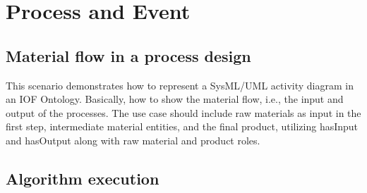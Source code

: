 \chapter{Process and Event}


\section*{Material flow in a process design}
This scenario demonstrates how to represent a SysML/UML activity diagram in an IOF Ontology.
Basically, how to show the material flow, i.e., the input and output of the processes.
The use case should include raw materials as input in the first step, intermediate material entities, and the final product, utilizing hasInput and hasOutput along with raw material and product roles.



\section{Algorithm execution}
\label{sec-algorithm-execution}

